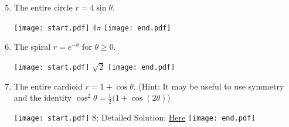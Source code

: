 \documentclass[12pt]{article}
\begin{document}

\begin{enumerate}
\setcounter{enumi}{4}

\item The entire circle $r=4\sin{\theta}$.

\texttt{[image: start.pdf]}
{{$4\pi$}}
\texttt{[image: end.pdf]}


\item The spiral $r=e^{-\theta}$ for $\theta \geq 0$.

\texttt{[image: start.pdf]}
{{$\sqrt{2}$}}
\texttt{[image: end.pdf]}


\item The entire cardioid $r=1+\cos{\theta}$. (Hint: It may be useful to use symmetry and the identity $\cos^2{\theta}=\frac{1}{2}(1+\cos{(2\theta)}$)

\texttt{[image: start.pdf]}
{{8; Detailed Solution: \textcolor{blue}{\href{http://www.math.drexel.edu/classes/Calculus/resources/Math122HW/Solutions/122_19_Polar_Calc_07.pdf}{Here}}}}
\texttt{[image: end.pdf]}


\end{enumerate}

\end{document}
